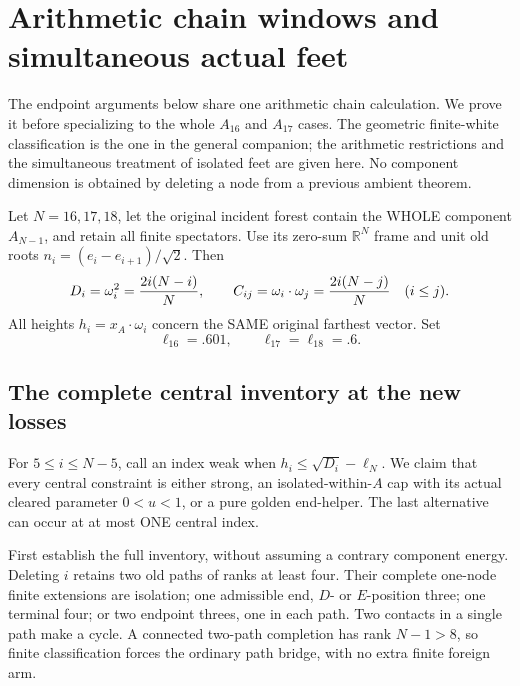 
\section{Arithmetic chain windows and simultaneous actual feet}
\label{app:arithmeticchain}

The endpoint arguments below share one arithmetic chain calculation.
We prove it before specializing to the whole \(A_{16}\) and
\(A_{17}\) cases.  The geometric finite-white classification is the
one in the general companion; the arithmetic restrictions and the
simultaneous treatment of isolated feet are given here.
No component dimension is obtained by deleting a node from a
previous ambient theorem.

Let \(N=16,17,18\), let the original incident forest contain the
WHOLE component \(A_{N-1}\), and retain all finite spectators.
Use its zero-sum \(\mathbb R^N\) frame and unit old roots
\(n_i=(e_i-e_{i+1})/\sqrt2\).  Then
\[
 D_i=\omega_i^2={2i(N-i)\over N},\qquad
 C_{ij}=\omega_i\cdot\omega_j={2i(N-j)\over N}\quad(i\le j).
\]
All heights \(h_i=x_A\cdot\omega_i\) concern the SAME original
farthest vector.  Set
\[
             \ell_{16}=.601,\qquad\ell_{17}=\ell_{18}=.6.
\]

\subsection{The complete central inventory at the new losses}
\label{app:arithchaininventory}

For \(5\le i\le N-5\), call an index weak when
\(h_i\le\sqrt{D_i}-\ell_N\).
We claim that every central constraint is either strong, an
isolated-within-\(A\) cap with its actual cleared parameter
\(0<u<1\), or a pure golden end-helper.
The last alternative can occur at at most ONE central index.

First establish the full inventory, without assuming a contrary
component energy.  Deleting \(i\) retains two old paths of ranks
at least four.  Their complete one-node finite extensions are
isolation; one admissible end, \(D\)- or \(E\)-position three;
one terminal four; or two endpoint threes, one in each path.
Two contacts in a single path make a cycle.
A connected two-path completion has rank \(N-1>8\), so finite
classification forces the ordinary path bridge, with no extra
finite foreign arm.

